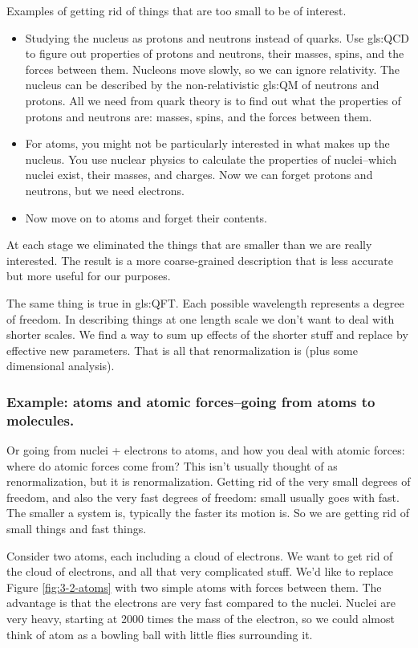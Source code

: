 \documentclass[]{article}
\begin{document}
Examples of getting rid of things that are too small to be of interest.
\begin{itemize}
	\item Studying the nucleus as protons and neutrons instead of quarks. Use \gls{gls:QCD} to figure out properties of protons and neutrons, their masses, spins,  and the forces between them. Nucleons move slowly, so we can ignore relativity. The nucleus can be described by the non-relativistic \glsdesc{gls:QM} of neutrons and protons. All we need from quark theory is to find out what the properties of protons and neutrons are: masses, spins, and the forces between them.
	\item For atoms, you might not be particularly interested in what makes up the nucleus. You use nuclear physics to calculate the properties of nuclei--which nuclei exist, their masses, and charges. Now we can forget protons and neutrons, but we need electrons.
	\item Now move on to atoms and forget their contents.
\end{itemize}

At each stage we eliminated the things that are smaller than we are really interested. The result is a more coarse-grained description that is less accurate but more useful for our purposes.

The same thing is true in \glsdesc{gls:QFT}. Each possible wavelength represents a degree of freedom. In describing things at one length scale we don't want to deal with shorter scales. We find a way to sum up effects of the shorter stuff and replace by effective new parameters. That is all that renormalization is (plus some dimensional analysis).

\subsubsection{Example: atoms and atomic forces--going from atoms to molecules.}

Or going from nuclei + electrons to atoms, and how you deal with atomic forces: where do atomic forces come from? This isn't usually thought of as renormalization, but it is renormalization. Getting rid of the very small degrees of freedom, and also the very fast degrees of freedom: small usually goes with fast. The smaller a system is, typically the faster its motion is. So we are getting rid of small things and fast things.

Consider two atoms, each including a cloud of electrons. We want to get rid of the cloud of electrons, and all that very complicated stuff. We'd like to replace Figure \ref{fig:3-2-atoms} with two simple atoms with forces between them. The advantage is that the electrons are very fast compared to the nuclei. Nuclei are very heavy, starting at 2000 times the mass of the electron, so we could almost think of atom as a bowling ball with little flies surrounding it.
\end{document}
